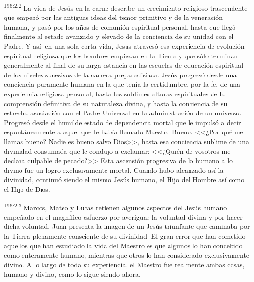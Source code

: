 \par 
\textsuperscript{196:2.2} La vida de Jesús en la carne describe un crecimiento religioso trascendente que empezó por las antiguas ideas del temor primitivo y de la veneración humana, y pasó por los años de comunión espiritual personal, hasta que llegó finalmente al estado avanzado y elevado de la conciencia de su unidad con el Padre. Y así, en una sola corta vida, Jesús atravesó esa experiencia de evolución espiritual religiosa que los hombres empiezan en la Tierra y que sólo terminan generalmente al final de su larga estancia en las escuelas de educación espiritual de los niveles sucesivos de la carrera preparadisiaca. Jesús progresó desde una conciencia puramente humana en la que tenía la certidumbre, por la fe, de una experiencia religiosa personal, hasta las sublimes alturas espirituales de la comprensión definitiva de su naturaleza divina, y hasta la conciencia de su estrecha asociación con el Padre Universal en la administración de un universo. Progresó desde el humilde estado de dependencia mortal que le impulsó a decir espontáneamente a aquel que le había llamado Maestro Bueno: <<¿Por qué me llamas bueno? Nadie es bueno salvo Dios>>, hasta esa conciencia sublime de una divinidad consumada que le condujo a exclamar: <<¿Quién de vosotros me declara culpable de pecado?>> Esta ascensión progresiva de lo humano a lo divino fue un logro exclusivamente mortal. Cuando hubo alcanzado así la divinidad, continuó siendo el mismo Jesús humano, el Hijo del Hombre así como el Hijo de Dios.

\par 
\textsuperscript{196:2.3} Marcos, Mateo y Lucas retienen algunos aspectos del Jesús humano empeñado en el magnífico esfuerzo por averiguar la voluntad divina y por hacer dicha voluntad. Juan presenta la imagen de un Jesús triunfante que caminaba por la Tierra plenamente consciente de su divinidad. El gran error que han cometido aquellos que han estudiado la vida del Maestro es que algunos lo han concebido como enteramente humano, mientras que otros lo han considerado exclusivamente divino. A lo largo de toda su experiencia, el Maestro fue realmente ambas cosas, humano y divino, como lo sigue siendo ahora.

